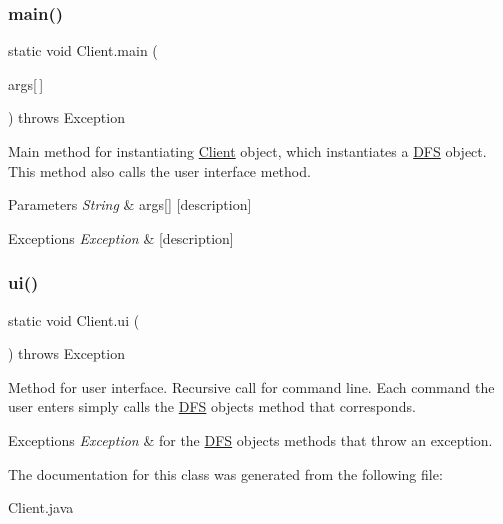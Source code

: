\subsubsection{\texorpdfstring{main()}{main()}}
{\footnotesize\ttfamily static void Client.\+main (\begin{DoxyParamCaption}\item[{String}]{args\mbox{[}$\,$\mbox{]} }\end{DoxyParamCaption}) throws Exception\hspace{0.3cm}{\ttfamily [static]}}

Main method for instantiating \hyperlink{class_client}{Client} object, which instantiates a \hyperlink{class_d_f_s}{D\+FS} object. This method also calls the user interface method. 
\begin{DoxyParams}{Parameters}
{\em String} & args\mbox{[}\mbox{]} \mbox{[}description\mbox{]} \\
\hline
\end{DoxyParams}

\begin{DoxyExceptions}{Exceptions}
{\em Exception} & \mbox{[}description\mbox{]} \\
\hline
\end{DoxyExceptions}
\mbox{\label{class_client_a5a2336b78c9168bbfe9fb6664b4d5fb0}} 
\subsubsection{\texorpdfstring{ui()}{ui()}}
{\footnotesize\ttfamily static void Client.\+ui (\begin{DoxyParamCaption}{ }\end{DoxyParamCaption}) throws Exception\hspace{0.3cm}{\ttfamily [static]}}

Method for user interface. Recursive call for command line. Each command the user enters simply calls the \hyperlink{class_d_f_s}{D\+FS} object\textquotesingle{}s method that corresponds. 
\begin{DoxyExceptions}{Exceptions}
{\em Exception} & for the \hyperlink{class_d_f_s}{D\+FS} object\textquotesingle{}s methods that throw an exception. \\
\hline
\end{DoxyExceptions}


The documentation for this class was generated from the following file\+:\begin{DoxyCompactItemize}
\item 
Client.\+java\end{DoxyCompactItemize}
